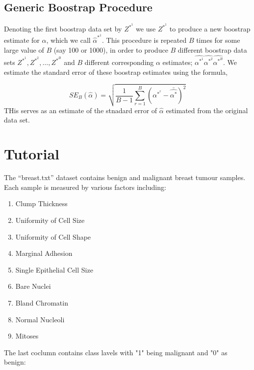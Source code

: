 \documentclass[twoside]{article}
\theoremstyle{definition}
\theoremstyle{definition}
\begin{document}
\subsection{Generic Boostrap Procedure}

\begin{dBox}
Denoting the first boostrap data set by $Z^{*^1}$ we use $Z^{*^1}$ to produce a new boostrap estimate for $\alpha$, which we call $\hat{\alpha}^{*^1}$. This procedure is repeated $B$ times for some large value of $B$ (say 100 or 1000), in order to produce $B$ different boostrap data sets $Z^{*^1} ,Z^{*^2}, \dots, Z^{*^B}$ and $B$ different corresponding $\alpha$ estimates; $\hat{\alpha^{*^1}} \hat{\alpha^{*^2}} \hat{\alpha^{*^B}}$. We estimate the standard error of these boostrap estimates using the formula,

\begin{equation}
   SE_B(\hat{\alpha}) = \sqrt{\frac{1}{B-1} \sum^B_{r=1}(\alpha^{*^r}- \bar{\hat{\alpha^{*}}})^2}
\end{equation}
THis serves as an estimate of the stnadard error of $\hat{\alpha}$ estimated from the original data set.
\end{dBox}

\section{Tutorial}
The “breast.txt” dataset contains benign and malignant breast tumour samples. Each sample
is measured by various factors including:
\begin{enumerate}
\item Clump Thickness 
\item Uniformity of Cell Size
\item Uniformity of Cell Shape
\item Marginal Adhesion
\item Single Epithelial Cell Size
\item Bare Nuclei
\item Bland Chromatin
\item Normal Nucleoli
\item Mitoses
\end{enumerate}

The last coclumn contains class lavels with "1" being malignant and "0" as benign:
\end{document}
